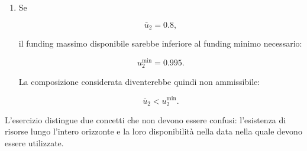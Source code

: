\begin{enumerate}
\[
1.020(0.995)
=
1.0149.
\]

Il bilancio terminale diventa

\[
12
=
8
+
1.0149
+
g_3,
\]

da cui

\[
g_3
=
2.9851.
\]

Il funding anticipa quindi $0.995$ unit\`a alla seconda data e genera alla
terza un rimborso pari a $1.0149$.

\item Se

\[
\bar u_2=0.8,
\]

il funding massimo disponibile sarebbe inferiore al funding minimo necessario:

\[
u_2^{\min}=0.995.
\]

La composizione considerata diventerebbe quindi non ammissibile:

\[
\bar u_2<u_2^{\min}.
\]

\end{enumerate}

L'esercizio distingue due concetti che non devono essere confusi:
l'esistenza di risorse lungo l'intero orizzonte e la loro disponibilit\`a
nella data nella quale devono essere utilizzate.



